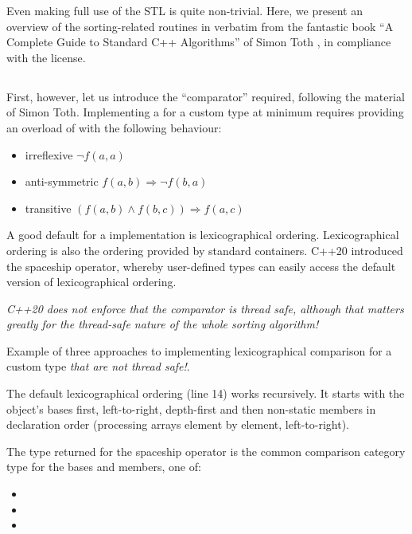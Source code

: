Even making full use of the STL is quite non-trivial. Here, we present an overview of the sorting-related routines in verbatim from the fantastic book ``A Complete Guide to Standard C++ Algorithms'' of Simon Toth \cite{toth2023}, in compliance with the license. 

\subsection{}

First, however, let us introduce the  ``comparator'' required, following the material of Simon Toth.
Implementing a  for a custom type at minimum requires providing an overload of  with the following behaviour:

\begin{itemize}
    \item irreflexive $\neg f(a,a)$
    \item anti-symmetric $f(a,b) \Rightarrow \neg f(b,a)$
    \item transitive $(f(a,b) \wedge f(b,c)) \Rightarrow f(a,c)$
\end{itemize}

A good default for a  implementation is lexicographical ordering. Lexicographical ordering is also the ordering provided by standard containers.
C++20 introduced the spaceship operator, whereby user-defined types can easily access the default version of lexicographical ordering.

\emph{C++20 does not enforce that the comparator is thread safe, although that matters greatly for the thread-safe nature of the whole sorting algorithm!}

\begin{codebox}[breakable]{\href{https://compiler-explorer.com/z/7PjY8fc1G}{\ExternalLink}}
\footnotesize Example of three approaches to implementing lexicographical comparison for a custom type \emph{that are not thread safe!}.
\tcblower
{}
\end{codebox}

The default lexicographical ordering (line 14) works recursively. It starts with the object’s bases first, left-to-right, depth-first and then non-static members in declaration order (processing arrays element by element, left-to-right).

The type returned for the spaceship operator is the common comparison category type for the bases and members, one of:
\begin{itemize}
    \item {}
    \item {}
    \item {}
\end{itemize}

